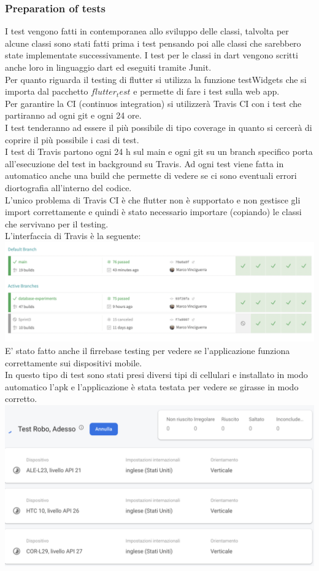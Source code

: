 \documentclass{article}
\begin{document}
\subsubsection{Preparation of tests}
I test vengono fatti in contemporanea allo sviluppo delle classi, talvolta per alcune classi
sono stati fatti prima i test pensando poi alle classi che sarebbero state implementate successivamente.
I test per le classi in dart vengono scritti anche loro in linguaggio dart ed eseguiti tramite Junit.
\\Per quanto riguarda il testing di flutter si utilizza la funzione testWidgets che si importa 
dal pacchetto $flutter_test$ e permette di fare i test sulla web app.
\\Per garantire la CI (continuos integration) si utilizzerà Travis CI con i test che partiranno ad
ogni git e ogni 24 ore.
\\I test tenderanno ad essere il più possibile di tipo coverage in quanto si cercerà di coprire 
il più possibile i casi di test.
\\I test di Travis partono ogni 24 h sul main e ogni git su un branch specifico porta all'esecuzione 
del test in background su Travis. Ad ogni test viene fatta in automatico anche una build che permette
di vedere se ci sono eventuali errori diortografia all'interno del codice.
\\L'unico problema di Travis CI è che flutter non è supportato e non gestisce gli import correttamente e quindi è stato necessario importare (copiando) le classi che 
servivano per il testing.
\\L'interfaccia di Travis è la seguente:
\\\includegraphics[scale = 0.25]{"Immagini/Travis.PNG"}
\\E' stato fatto anche il firrebase testing per vedere se l'applicazione funziona correttamente
sui dispositivi mobile.
\\In questo tipo di test sono stati presi diversi tipi di cellulari e installato in modo automatico 
l'apk e l'applicazione è stata testata per vedere se girasse in modo corretto.
\\\includegraphics[scale = 0.45]{"Immagini/Firebase_testing.PNG"}
\end{document}
